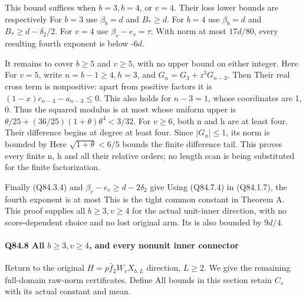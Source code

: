 This bound suffices when \(b=3,\allowbreak  b=4\), or \(v=4\). Their loss lower bounds are
respectively
For \(b=3\) use \(\beta_b=d\) and \(B_*\ge d\). For \(b=4\) use \(\beta_b=d\) and
\(B_*\ge d-\delta_2/2\). For \(v=4\) use \(\beta_v-e_v=\tau\).
With norm at most \(17d/80\), every resulting fourth exponent is below -\(6d\).

It remains to cover \(b\ge 5\) and \(v\ge 5\), with no upper bound on either integer.
Here
For \(v=5\), write \(n=b-1\ge 4,\allowbreak  h=3\), and
\(G_n=G_3+z^3G_{n-3}\). Then
Their real cross term is nonpositive: apart from positive factors it is
\((1-x)c_{n-3}-a_{n-3}\le0\). This also holds for \(n-3=1\), whose
coordinates are 1, 0. Thus the squared modulus is at most
whose uniform upper is
\(\theta/25+(36/25)(1+\theta)\theta^4<3/32\).
For \(v\ge 6\), both n and h are at least four. Their difference begins at
degree at least four. Since \(|G_n|\le1\), its norm is bounded by
Here \(\sqrt{1+\theta}<6/5\) bounds the finite difference tail. This
proves every finite n, h and all their relative orders; no length scan is
being substituted for the finite factorization.

Finally (Q84.3.4) and \(\beta_v-e_v\ge d-2\delta_2\) give
Using (Q84.7.4) in (Q84.1.7), the fourth exponent is at most
This is the tight common constant in Theorem A. This proof supplies all
\(b\ge 3,\allowbreak  v\ge 4\) for the actual unit-inner direction, with no score-dependent
choice and no lost original arm. Its is also bounded by \(9d/4\).

\paragraph{Q84.8 All \(b\ge 3,\allowbreak  v\ge 4\), and every nonunit inner connector}

Return to the original \(H=p \bar f_2W_vX_{b,\allowbreak  L}\) direction, \(L\ge 2\).
We give the remaining full-domain raw-norm certificates. Define
All bounds in this section retain \(C_s\) with its actual constant and mean.

